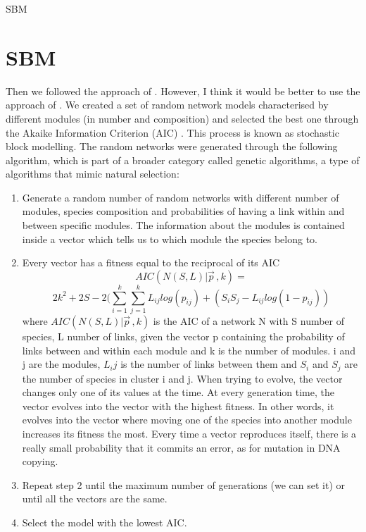 SBM
\section{SBM}
        Then we followed the approach of \citet{Allesina2009a}. However, I think it would be better to use the approach of \citep{Sander2015}. We created a set of random network models characterised by different modules (in number and composition) and selected the best one through the Akaike Information Criterion (AIC) \citep{Akaike1998}. This process is known as stochastic block modelling. The random networks were generated through the following algorithm, which is part of a broader category called genetic algorithms, a type of algorithms that mimic natural selection: 
        \begin{enumerate}
            \item Generate a random number of random networks with different number of modules, species composition and probabilities of having a link within and between specific modules. The information about the modules is contained inside a vector which tells us to which module the species belong to. 
            \item Every vector has a fitness equal to the reciprocal of its AIC
            \begin{equation}
                AIC(N(S,L)|\vec{p}^{\,},k)=
            \end{equation}
            \begin{equation*}
                2k^2+2S-2(\sum^k_{i=1}\sum^k_{j=1}L_{ij}log(p_{ij})+(S_iS_j-L_{ij}log(1-p_{ij}))
            \end{equation*}
            where $AIC(N(S,L)|\vec{p}^{\,},k)$ is the AIC of a network N with S number of species, L number of links, given the vector p containing the probability of links between and within each module and k is the number of modules. i and j are the modules, $L_ij$ is the number of links between them and $S_i$ and $S_j$ are the number of species in cluster i and j. When trying to evolve, the vector changes only one of its values at the time. At every generation time, the vector evolves into the vector with the highest fitness. In other words, it evolves into the vector where moving one of the species into another module increases its fitness the most. Every time a vector reproduces itself, there is a really small probability that it commits an error, as for mutation in DNA copying. 
            \item Repeat step 2 until the maximum number of generations (we can set it) or until all the vectors are the same. 
            \item Select the model with the lowest AIC.
        \end{enumerate}

